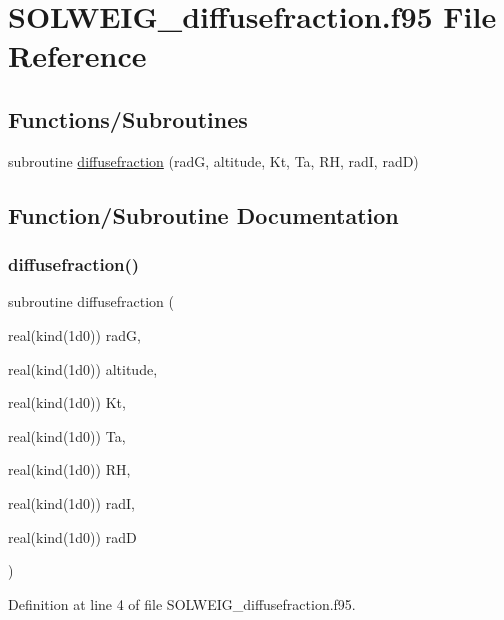 \hypertarget{_s_o_l_w_e_i_g__diffusefraction_8f95}{}\section{S\+O\+L\+W\+E\+I\+G\+\_\+diffusefraction.\+f95 File Reference}
\label{_s_o_l_w_e_i_g__diffusefraction_8f95}
\subsection*{Functions/\+Subroutines}
\begin{DoxyCompactItemize}
\item 
subroutine \hyperlink{_s_o_l_w_e_i_g__diffusefraction_8f95_ad7b7378ec2c1f4136543280f64bd1f8d}{diffusefraction} (radG, altitude, Kt, Ta, RH, radI, radD)
\end{DoxyCompactItemize}


\subsection{Function/\+Subroutine Documentation}
\mbox{\label{_s_o_l_w_e_i_g__diffusefraction_8f95_ad7b7378ec2c1f4136543280f64bd1f8d}} 
\subsubsection{\texorpdfstring{diffusefraction()}{diffusefraction()}}
{\footnotesize\ttfamily subroutine diffusefraction (\begin{DoxyParamCaption}\item[{real(kind(1d0))}]{radG,  }\item[{real(kind(1d0))}]{altitude,  }\item[{real(kind(1d0))}]{Kt,  }\item[{real(kind(1d0))}]{Ta,  }\item[{real(kind(1d0))}]{RH,  }\item[{real(kind(1d0))}]{radI,  }\item[{real(kind(1d0))}]{radD }\end{DoxyParamCaption})}



Definition at line 4 of file S\+O\+L\+W\+E\+I\+G\+\_\+diffusefraction.\+f95.

